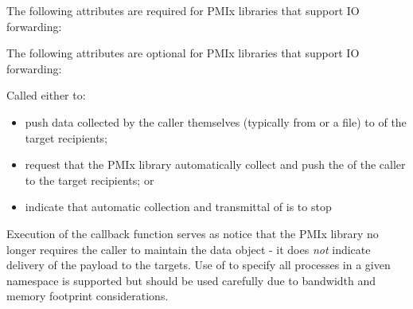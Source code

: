 \reqattrstart
The following attributes are required for \ac{PMIx} libraries that support \ac{IO} forwarding:


\reqattrend

\optattrstart
The following attributes are optional for \ac{PMIx} libraries that support \ac{IO} forwarding:


\optattrend

\descr

Called either to:

\begin{itemize}
    \item push data collected by the caller themselves (typically from  or a file) to  of the target recipients;
    \item request that the \ac{PMIx} library automatically collect and push the  of the caller to the target recipients; or
    \item indicate that automatic collection and transmittal of  is to stop
\end{itemize}

\adviceuserstart
Execution of the  callback function serves as notice that the \ac{PMIx} library no longer requires the caller to maintain the  data object - it does \textit{not} indicate delivery of the payload to the targets. Use of  to specify all processes in a given namespace is supported but should be used carefully due to bandwidth and memory footprint considerations.
\adviceuserend

